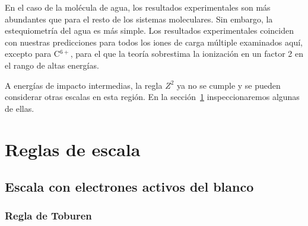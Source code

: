En el caso de la molécula de agua, los resultados experimentales son más 
abundantes que para el resto de los sistemas moleculares. Sin embargo,
la estequiometría del agua es más simple. Los resultados experimentales
\cite{Luna2007,Bolorizadeh86,H_Rudd85,toburen80,Ohsawa05,He_Rudd85,
toburen80,Bhattacharjee:17,Bhattacharjee:16}
coinciden con nuestras predicciones para todos los iones de carga 
múltiple examinados aquí, excepto para C$^{6+}$, para el que la teoría
sobrestima la ionización en un factor 2 en el rango de altas energías.

A energías de impacto intermedias, la regla $Z^2$ ya no se cumple y se 
pueden considerar otras escalas en esta región. En la 
sección~\ref{sec:scaling} inspeccionaremos algunas de ellas.




\section{Reglas de escala}
\label{sec:scaling}

\subsection{Escala con electrones activos del blanco}
\label{subsec:ne_scaling}

\subsubsection{Regla de Toburen}
\label{subsec:toburen}

